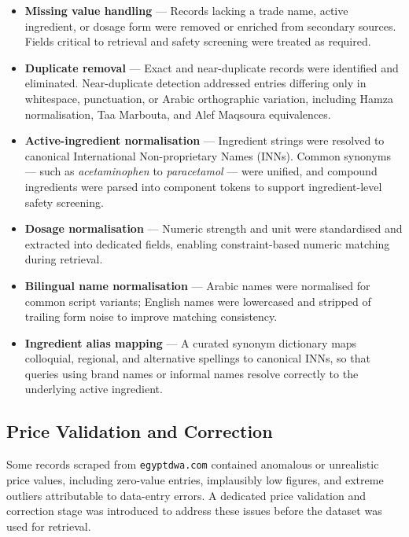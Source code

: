 \documentclass[12pt,a4paper]{article}
\begin{document}
\begin{itemize}[leftmargin=1.5em]
    \item \textbf{Missing value handling} --- Records lacking a trade name,
          active ingredient, or dosage form were removed or enriched from
          secondary sources. Fields critical to retrieval and safety
          screening were treated as required.

    \item \textbf{Duplicate removal} --- Exact and near-duplicate records
          were identified and eliminated. Near-duplicate detection addressed
          entries differing only in whitespace, punctuation, or Arabic
          orthographic variation, including Hamza normalisation, Taa
          Marbouta, and Alef Maqsoura equivalences.

    \item \textbf{Active-ingredient normalisation} --- Ingredient strings
          were resolved to canonical International Non-proprietary Names
          (INNs). Common synonyms --- such as \textit{acetaminophen}
          to \textit{paracetamol} --- were unified, and compound
          ingredients were parsed into component tokens to support
          ingredient-level safety screening.

    \item \textbf{Dosage normalisation} --- Numeric strength and unit
          were standardised and extracted into dedicated fields, enabling
          constraint-based numeric matching during retrieval.

    \item \textbf{Bilingual name normalisation} --- Arabic names were
          normalised for common script variants; English names were
          lowercased and stripped of trailing form noise to improve
          matching consistency.

    \item \textbf{Ingredient alias mapping} --- A curated synonym dictionary
          maps colloquial, regional, and alternative spellings to canonical
          INNs, so that queries using brand names or informal names resolve
          correctly to the underlying active ingredient.
\end{itemize}

\subsection{Price Validation and Correction}

Some records scraped from \texttt{egyptdwa.com} contained anomalous or
unrealistic price values, including zero-value entries, implausibly low
figures, and extreme outliers attributable to data-entry errors. A
dedicated price validation and correction stage was introduced to address
these issues before the dataset was used for retrieval.
\end{document}
